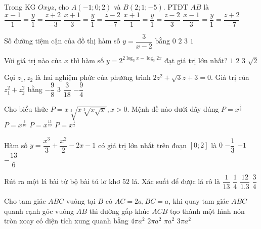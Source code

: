 \begin{ex}%
Trong KG $Oxyz$, cho $A(-1; 0; 2)$ và $B(2; 1;-5)$. PTĐT $AB$ là
\choice
{$\dfrac{x-1}{1}=\dfrac{y}{1}=\dfrac{z+2}{-3}$}
{\True $\dfrac{x+1}{3}=\dfrac{y}{1}=\dfrac{z-2}{-7}$}
{$\dfrac{x+1}{1}=\dfrac{y}{1}=\dfrac{z-2}{3}$}
{$\dfrac{x-1}{3}=\dfrac{y}{1}=\dfrac{z+2}{-7}$}

\end{ex}
\begin{ex}%
Số đường tiệm cận của đồ thị hàm số $y=\dfrac{3}{x-2}$ bằng
\choice
{$0$}
{\True $2$}
{$3$}
{$1$}

\end{ex}
\begin{ex}%
Với giá trị nào của $x$ thì hàm số $y=2^{2\log_3 x-\log_3 2 x}$ đạt giá trị lớn nhất?
\choice
{$1$}
{$2$}
{\True $3$}
{$\sqrt{2}$}

\end{ex}
\begin{ex}%
Gọi $z_1, z_2$ là hai nghiệm phức của phương trình $2 z^2+\sqrt{3} z+3=0$. Giá trị của $z_1^2+z_2^2$ bằng
\choice
{$-\dfrac{9}{8}$}
{$3$}
{$\dfrac{3}{18}$}
{\True $-\dfrac{9}{4}$}

\end{ex}
\begin{ex}%
Cho biểu thức $P=x \sqrt[5]{x \sqrt[3]{x \sqrt{x}}}, x>0$. Mệnh đề nào dưới đây đúng
\choice
{$P=x^{\frac{2}{3}}$}
{$P=x^{\frac{3}{10}}$}
{\True $P=x^{\frac{13}{10}}$}
{$P=x^{\frac{1}{2}}$}

\end{ex}
\begin{ex}%
Hàm số $y=\dfrac{x^3}{3}+\dfrac{x^2}{2}-2 x-1$ có giá trị lớn nhất trên đoạn $[0; 2]$ là
\choice
{$0$}
{\True $-\dfrac{1}{3}$}
{$-1$}
{$-\dfrac{13}{6}$}

\end{ex}
\begin{ex}%
Rút ra một lá bài từ bộ bài tú lơ khơ $52$ lá. Xác suất để được lá rô là
{$\dfrac{1}{13}$}
{\True  $\dfrac{1}{4}$}
{ $\dfrac{12}{1.3}$}
{ $\dfrac{3}{4}$}

\end{ex}
\begin{ex}%
Cho tam giác $ABC$ vuông tại $B$ có $AC=2 a, BC=a$, khi quay tam giác $ABC$ quanh cạnh góc vuông $AB$ thì đường gấp khúc $ACB$ tạo thành một hình nón tròn xoay có diện tích xung quanh bằng
\choice
{$4\pi a^2$}
{\True $2\pi a^2$}
{$\pi a^2$}
{$3\pi a^2$}

\end{ex}

